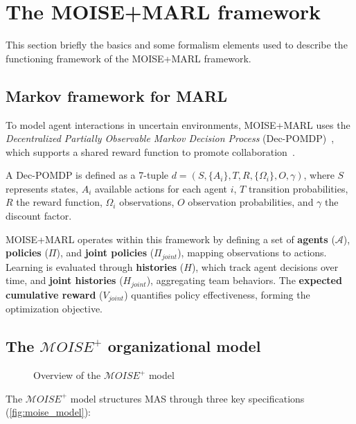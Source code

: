 \documentclass[pdflatex,sn-mathphys-num]{sn-jnl}%
\theoremstyle{thmstyleone}%
\theoremstyle{thmstyletwo}%
\theoremstyle{thmstylethree}%
\begin{document}
\clearpage

\section{The MOISE+MARL framework}\label{sec:moise_marl}

This section briefly the basics and some formalism elements used to describe the functioning framework of the MOISE+MARL framework.

\subsection{Markov framework for MARL}

To model agent interactions in uncertain environments, MOISE+MARL uses the \textit{Decentralized Partially Observable Markov Decision Process} (Dec-POMDP)~\citep{Oliehoek2016}, which supports a shared reward function to promote collaboration~\citep{Beynier2013}. 

A Dec-POMDP is defined as a 7-tuple $d = (S, \{A_i\}, T, R, \{\Omega_i\}, O, \gamma)$, where $S$ represents states, $A_i$ available actions for each agent $i$, $T$ transition probabilities, $R$ the reward function, $\Omega_i$ observations, $O$ observation probabilities, and $\gamma$ the discount factor. 

MOISE+MARL operates within this framework by defining a set of \textbf{agents} ($\mathcal{A}$), \textbf{policies} ($\Pi$), and \textbf{joint policies} ($\Pi_{joint}$), mapping observations to actions. Learning is evaluated through \textbf{histories} ($H$), which track agent decisions over time, and \textbf{joint histories} ($H_{joint}$), aggregating team behaviors. The \textbf{expected cumulative reward} ($V_{joint}$) quantifies policy effectiveness, forming the optimization objective.

\subsection{The $\mathcal{M}OISE^+$ organizational model}

\begin{figure}[h!]
    \centering
    
    \caption{Overview of the $\mathcal{M}OISE^+$ model}
    \label{fig:moise_model}
\end{figure}

The $\mathcal{M}OISE^+$ model structures MAS through three key specifications (\autoref{fig:moise_model}): 
\end{document}
